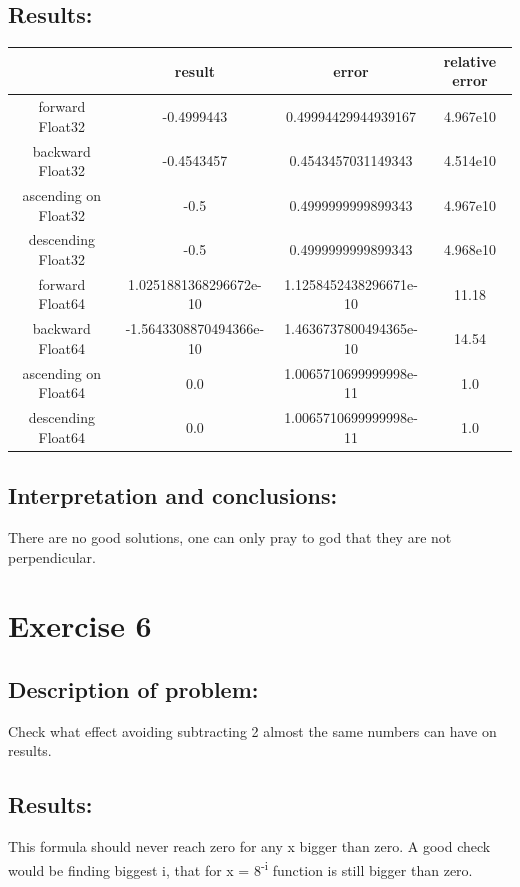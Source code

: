 \documentclass{article}
\begin{document}
\subsection*{Results:}
\begin{center}
    \begin{tabular}{| c | c | c | c |}
        \hline
         & result & error & relative error\\ 
        \hline
        forward Float32 & -0.4999443 & 0.49994429944939167 & 4.967e10\\
        backward Float32 & -0.4543457 & 0.4543457031149343 & 4.514e10\\
        ascending on Float32 & -0.5 & 0.4999999999899343 & 4.967e10\\
        descending Float32 & -0.5 & 0.4999999999899343 & 4.968e10\\
        \hline
        forward Float64 & 1.0251881368296672e-10 & 1.1258452438296671e-10 & 11.18 \\
        backward Float64 & -1.5643308870494366e-10 & 1.4636737800494365e-10 & 14.54 \\
        ascending on Float64 & 0.0 & 1.0065710699999998e-11 & 1.0 \\
        descending Float64 & 0.0 & 1.0065710699999998e-11 & 1.0\\
        \hline
    \end{tabular}
    \end{center}

\subsection*{Interpretation and conclusions:}
There are no good solutions, one can only pray to god that they are not perpendicular.

\section*{Exercise 6}
\subsection*{Description of problem:}
Check what effect avoiding subtracting 2 almost the same numbers can have on results.

\subsection*{Results:}
This formula should never reach zero for any x bigger than zero. A good check would be finding biggest i, that for x = 8\textsuperscript{-i} function is still bigger than zero.
\end{document}
